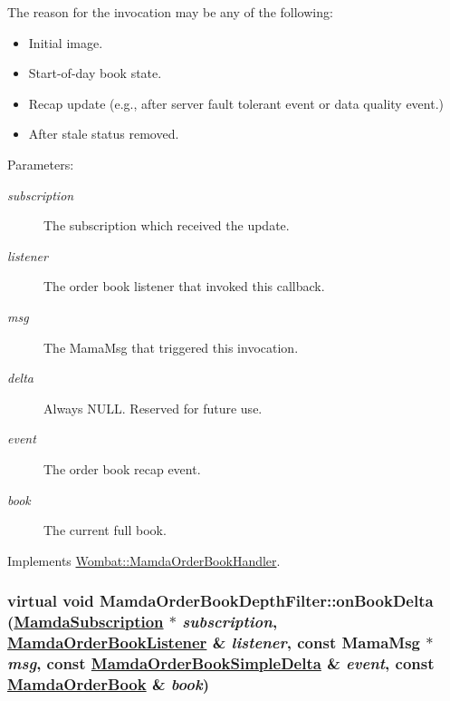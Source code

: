 The reason for the invocation may be any of the following:\begin{itemize}
\item Initial image.\item Start-of-day book state.\item Recap update (e.g., after server fault tolerant event or data quality event.)\item After stale status removed.\end{itemize}


\begin{Desc}
\item[Parameters:]
\begin{description}
\item[{\em subscription}]The subscription which received the update. \item[{\em listener}]The order book listener that invoked this callback. \item[{\em msg}]The Mama\-Msg that triggered this invocation. \item[{\em delta}]Always NULL. Reserved for future use. \item[{\em event}]The order book recap event. \item[{\em book}]The current full book. \end{description}
\end{Desc}


Implements \hyperlink{classWombat_1_1MamdaOrderBookHandler_2c353b638002894e89b98de5991f77ad}{Wombat::Mamda\-Order\-Book\-Handler}.\hypertarget{classMamdaOrderBookDepthFilter_f4fc478bf1306d3eb5af4f0278bfb198}{
\subsubsection[onBookDelta]{\setlength{\rightskip}{0pt plus 5cm}virtual void Mamda\-Order\-Book\-Depth\-Filter::on\-Book\-Delta (\hyperlink{classWombat_1_1MamdaSubscription}{Mamda\-Subscription} $\ast$ {\em subscription}, \hyperlink{classWombat_1_1MamdaOrderBookListener}{Mamda\-Order\-Book\-Listener} \& {\em listener}, const Mama\-Msg $\ast$ {\em msg}, const \hyperlink{classWombat_1_1MamdaOrderBookSimpleDelta}{Mamda\-Order\-Book\-Simple\-Delta} \& {\em event}, const \hyperlink{classWombat_1_1MamdaOrderBook}{Mamda\-Order\-Book} \& {\em book})}}
\label{classMamdaOrderBookDepthFilter_f4fc478bf1306d3eb5af4f0278bfb198}


